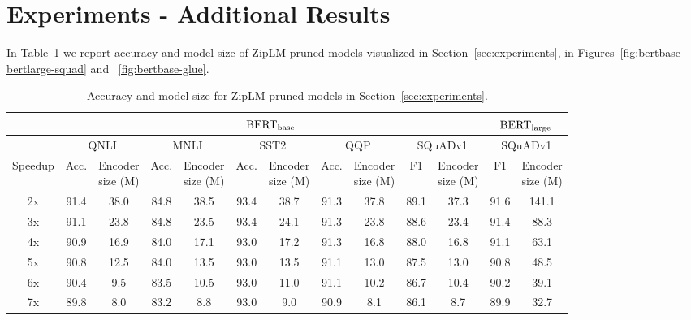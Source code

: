 \documentclass{article}
\newcommand{\bertbase}{$\textrm{BERT}_{\small{\textrm{base}}}\,$}
\newcommand{\bertlarge}{$\textrm{BERT}_{\small{\textrm{large}}}\,$}
\newcommand{\ourmethod}{ZipLM}
\theoremstyle{plain}
\theoremstyle{definition}
\theoremstyle{remark}
\begin{document}
\section{Experiments - Additional Results}
\label{app:numbers}
In Table~\ref{tab:numbers-for-plots} we report accuracy and model size of \ourmethod{} pruned models visualized in Section~\ref{sec:experiments}, in Figures~\ref{fig:bertbase-bertlarge-squad} and ~\ref{fig:bertbase-glue}.
\begin{table}
\setlength\tabcolsep{2pt}
    \caption{Accuracy and model size for \ourmethod{} pruned models in Section~\ref{sec:experiments}.}
    \label{tab:numbers-for-plots}
    \centering
    \small{
        \begin{tabular}{c|cc|cc|cc|cc|cc|cc}
        \toprule
         & \multicolumn{10}{c|}{\bertbase} & \multicolumn{2}{c}{\bertlarge} \\
         \midrule
         & \multicolumn{2}{c|}{QNLI} & \multicolumn{2}{c|}{MNLI} & \multicolumn{2}{c|}{SST2} & \multicolumn{2}{c|}{QQP} & \multicolumn{2}{c|}{SQuADv1} & \multicolumn{2}{c}{SQuADv1} \\ 
        Speedup & Acc. & \makecell{Encoder\\size (M)} & Acc. & \makecell{Encoder\\size (M)} & Acc. & \makecell{Encoder\\size (M)} & Acc. & \makecell{Encoder\\size (M)} & F1 & \makecell{Encoder\\size (M)} & F1 & \makecell{Encoder\\size (M)} \\ \midrule
        \phantom{3}2x & 91.4 & 38.0 & 84.8 & 38.5 & 93.4 & 38.7 & 91.3 & 37.8 & 89.1 & 37.3 & 91.6 & 141.1 \\ 
        \phantom{3}3x & 91.1 & 23.8 & 84.8 & 23.5 & 93.4 & 24.1 & 91.3 & 23.8 & 88.6 & 23.4 & 91.4 & \phantom{1}88.3 \\ 
        \phantom{3}4x & 90.9 & 16.9 & 84.0 & 17.1 & 93.0 & 17.2 & 91.3 & 16.8 & 88.0 & 16.8 & 91.1 & \phantom{1}63.1 \\ 
        \phantom{3}5x & 90.8 & 12.5 & 84.0 & 13.5 & 93.0 & 13.5 & 91.1 & 13.0 & 87.5 & 13.0 & 90.8 & \phantom{1}48.5 \\ 
        \phantom{3}6x & 90.4 & \phantom{3}9.5 & 83.5 & 10.5 & 93.0 & 11.0 & 91.1 & 10.2 & 86.7 & 10.4 & 90.2 & \phantom{1}39.1 \\ 
        \phantom{3}7x & 89.8 & \phantom{3}8.0 & 83.2 & \phantom{3}8.8 & 93.0 & \phantom{3}9.0 & 90.9 & \phantom{3}8.1 & 86.1 & \phantom{3}8.7 & 89.9 & \phantom{1}32.7 \\ 

\end{tabular}}
\end{table}
\end{document}
